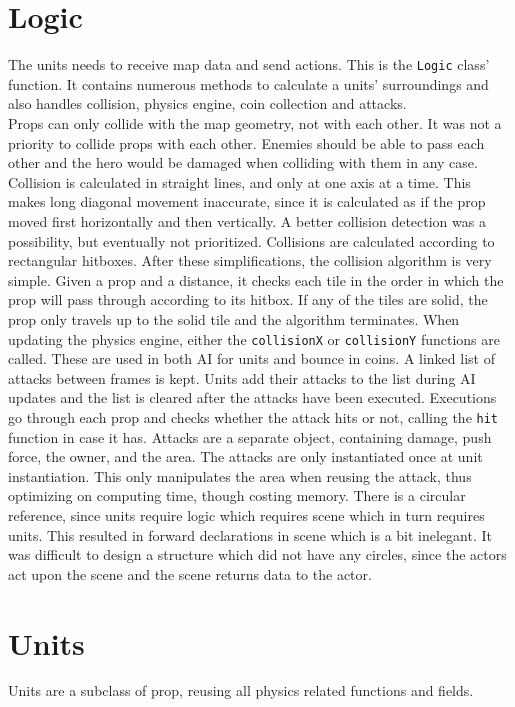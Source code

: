 \section{Logic} %
The units needs to receive map data and send actions. This is the {\tt Logic} class' function. It contains numerous methods to calculate a units' surroundings and also handles collision, physics engine, coin collection and attacks.\\
Props can only collide with the map geometry, not with each other. It was not a priority to collide props with each other. Enemies should be able to pass each other and the hero would be damaged when colliding with them in any case. Collision is calculated in straight lines, and only at one axis at a time. This makes long diagonal movement inaccurate, since it is calculated as if the prop moved first horizontally and then vertically. A better collision detection was a possibility, but eventually not prioritized. Collisions are calculated according to rectangular hitboxes.
\newline
After these simplifications, the collision algorithm is very simple. Given a prop and a distance, it checks each tile in the order in which the prop will pass through according to its hitbox. If any of the tiles are solid, the prop only travels up to the solid tile and the algorithm terminates. When updating the physics engine, either the {\tt collisionX} or {\tt collisionY} functions are called. These are used in both AI for units and bounce in coins.
\newline
A linked list of attacks between frames is kept. Units add their attacks to the list during AI updates and the list is cleared after the attacks have been executed. Executions go through each prop and checks whether the attack hits or not, calling the {\tt hit} function in case it has. Attacks are a separate object, containing damage, push force, the owner, and the area. The attacks are only instantiated once at unit instantiation. This only manipulates the area when reusing the attack, thus optimizing on computing time, though costing memory.
\newline
There is a circular reference, since units require logic which requires scene which in turn requires units. This resulted in forward declarations in scene which is a bit inelegant. It was difficult to design a structure which did not have any circles, since the actors act upon the scene and the scene returns data to the actor.

\section{Units}
Units are a subclass of prop, reusing all physics related functions and fields.

